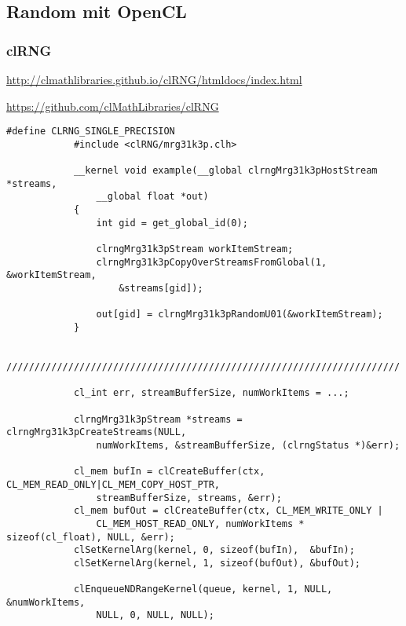 		\subsection{Random mit OpenCL}
			\subsubsection{clRNG}
			\url{http://clmathlibraries.github.io/clRNG/htmldocs/index.html}
			
			\url{https://github.com/clMathLibraries/clRNG}			
			\begin{lstlisting}[caption=clRNG Beispiel]
			#define CLRNG_SINGLE_PRECISION                                  
			#include <clRNG/mrg31k3p.clh>                                  
                                                                
			__kernel void example(__global clrngMrg31k3pHostStream *streams, 
				__global float *out)
			{                                                               
				int gid = get_global_id(0);                                 
                                                                      
				clrngMrg31k3pStream workItemStream;                          
				clrngMrg31k3pCopyOverStreamsFromGlobal(1, &workItemStream, 
					&streams[gid]); 
                                                                   
				out[gid] = clrngMrg31k3pRandomU01(&workItemStream);       
			}                                                                                                                               
    
			//////////////////////////////////////////////////////////////////////
			
			cl_int err, streamBufferSize, numWorkItems = ...;

			clrngMrg31k3pStream *streams = clrngMrg31k3pCreateStreams(NULL, 
				numWorkItems, &streamBufferSize, (clrngStatus *)&err);

			cl_mem bufIn = clCreateBuffer(ctx, CL_MEM_READ_ONLY|CL_MEM_COPY_HOST_PTR, 
				streamBufferSize, streams, &err);
			cl_mem bufOut = clCreateBuffer(ctx, CL_MEM_WRITE_ONLY | 
				CL_MEM_HOST_READ_ONLY, numWorkItems * sizeof(cl_float), NULL, &err);
			clSetKernelArg(kernel, 0, sizeof(bufIn),  &bufIn);
			clSetKernelArg(kernel, 1, sizeof(bufOut), &bufOut);

			clEnqueueNDRangeKernel(queue, kernel, 1, NULL, &numWorkItems, 
				NULL, 0, NULL, NULL);
			\end{lstlisting}
			
